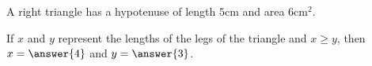 \documentclass{ximera}
\author{Kenneth Berglund}
\begin{document}
\begin{exercise}
A right triangle has a hypotenuse of length $5$cm and area 6cm$^2$. 

If $x$ and $y$ represent the lengths of the legs of the triangle and $x \ge y$, then $x = \answer{4}$ and $y = \answer{3}$. 

\end{exercise}
\end{document}
